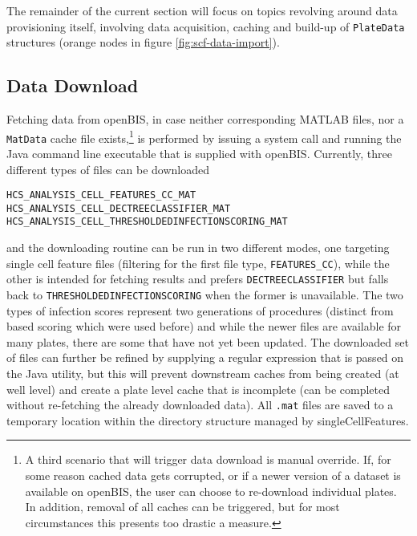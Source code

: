 The remainder of the current section will focus on topics revolving around data provisioning itself, involving data acquisition, caching and build-up of \texttt{PlateData} structures (orange nodes in figure \ref{fig:scf-data-import}).

\subsection{Data Download}
Fetching data from openBIS, in case neither corresponding MATLAB files, nor a \texttt{MatData} cache file exists,\footnote{A third scenario that will trigger data download is manual override. If, for some reason cached data gets corrupted, or if a newer version of a dataset is available on openBIS, the user can choose to re-download individual plates. In addition, removal of all caches can be triggered, but for most circumstances this presents too drastic a measure.} is performed by issuing a system call and running the Java command line executable that is supplied with openBIS. Currently, three different types of files can be downloaded

\begin{center}
\texttt{HCS_ANALYSIS_CELL_FEATURES_CC_MAT}
\texttt{HCS_ANALYSIS_CELL_DECTREECLASSIFIER_MAT}
\texttt{HCS_ANALYSIS_CELL_THRESHOLDEDINFECTIONSCORING_MAT}
\end{center}

and the downloading routine can be run in two different modes, one targeting single cell feature files (filtering for the first file type, \texttt{FEATURES_CC}), while the other is intended for fetching  results and prefers \texttt{DECTREECLASSIFIER} but falls back to \texttt{THRESHOLDEDINFECTIONSCORING} when the former is unavailable. The two types of infection scores represent two generations of  procedures (distinct from  based scoring which were used before) and while the newer files are available for many plates, there are some that have not yet been updated. The downloaded set of files can further be refined by supplying a regular expression that is passed on the Java utility, but this will prevent downstream caches from being created (at well level) and create a plate level cache that is incomplete (can be completed without re-fetching the already downloaded data). All \texttt{.mat} files are saved to a temporary location within the directory structure managed by singleCellFeatures.

